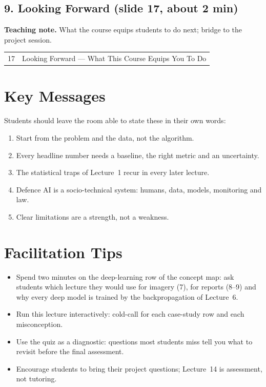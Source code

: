 \documentclass[11pt]{article}
\begin{document}
\subsection{9. Looking Forward \normalfont\small\color{GreyN}(slide 17, about 2 min)}

\textbf{Teaching note.} What the course equips students to do next; bridge to the project session.

\begin{center}\small\renewcommand{\arraystretch}{1.1}\begin{tabularx}{\textwidth}{@{}r X@{}}17 & Looking Forward --- What This Course Equips You To Do\\\end{tabularx}\end{center}

\section{Key Messages}Students should leave the room able to state these in their own words:\begin{keypoint}\begin{enumerate}\item Start from the problem and the data, not the algorithm.\item Every headline number needs a baseline, the right metric and an uncertainty.\item The statistical traps of Lecture~1 recur in every later lecture.\item Defence AI is a socio-technical system: humans, data, models, monitoring and law.\item Clear limitations are a strength, not a weakness.\end{enumerate}\end{keypoint}

\section{Facilitation Tips}\begin{itemize}\item Spend two minutes on the deep-learning row of the concept map: ask students which lecture they would use for imagery (7), for reports (8--9) and why every deep model is trained by the backpropagation of Lecture~6.\item Run this lecture interactively: cold-call for each case-study row and each misconception.\item Use the quiz as a diagnostic: questions most students miss tell you what to revisit before the final assessment.\item Encourage students to bring their project questions; Lecture~14 is assessment, not tutoring.\end{itemize}
\end{document}
